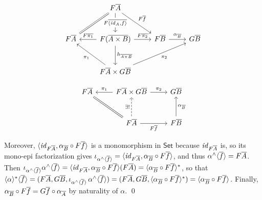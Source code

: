 \documentclass{lmcs}
\theoremstyle{plain}\newtheorem{satz}[thm]{Satz}
\newcommand{\set}{\mathsf{Set}}
\renewcommand{\id}{\mathit{id}}
\begin{document}
\begin{figure*}[ht]
  \vspace*{-0.15in}
  \begin{minipage}[b]{0.45\linewidth}
{\footnotesize
\[\begin{tikzcd}[row sep = large]
        &F\overline{A}
        \ar[d, "{F \overline{\langle \id_A, f \rangle}}" description]
        \ar[dl, equal]
        \ar[dr, "{F\ol{f}}"]\\
        F\overline{A}
        &F(\overline{A \times B})
        \ar[l, "{F\overline{\pi_1}}"']
        \ar[r, "{F\overline{\pi_2}}"]
        \ar[d, "{h_{\overline{A \times B}}}"]
        &F\overline{B}
        \ar[r, "{\alpha_{\ol{B}}}"]
        &G\overline{B}\\
        &F\overline{A} \times G\overline{B}
        \ar[ul, "{\pi_1}"] \ar[urr, "{\pi_2}"']
\end{tikzcd}\]}
\end{minipage}
  \begin{minipage}[b]{0.45\linewidth}
{\footnotesize
\[
      \begin{tikzcd}[row sep = large]
          F\overline{A}
          &F\overline{A} \times G\overline{B}
          \ar[l, "{\pi_1}"'] \ar[r, "{\pi_2}"]
          &G\overline{B}\\
          &F\overline{A}
          \ar[u, dashed, "{\exists !}"]
          \ar[ul, equal]
          \ar[r, "{F\ol{f}}"']
          &F{\ol{B}}
          \ar[u, "{\alpha_{\ol{B}}}"']
      \end{tikzcd}
      \]}
\end{minipage}
\end{figure*}

\vspace*{-0.1in}

\noindent
Moreover, $\langle \id_{F \ol{A}}, \alpha_{\ol{B}} \circ F\ol{f}
\rangle$ is a monomorphism in $\set$ because $\id_{F \ol{A}}$ is, so
its mono-epi factorization gives $\iota_{\alpha^\wedge
  \graph{\overline{f}}} = \langle \id_{F \ol{A}}, \alpha_{\ol{B}}
\circ F\ol{f} \rangle$, and thus $\alpha^\wedge \langle {\overline{f}} \rangle =
F\overline{A}$.  Then $\iota_{\alpha^\wedge \graph{\overline{f}}}
\alpha^\wedge \graph{\overline{f}} = \langle \id_{F \ol{A}},
\alpha_{\ol{B}} \circ F\ol{f} \rangle (F \ol{A}) = \graph{
  \alpha_{\ol{B}} \circ F\ol{f} }^*$, so that $\langle { \alpha } \rangle^*
\langle { \overline{f} } \rangle = (F\overline{A}, G\overline{B},
\iota_{\alpha^\wedge \langle {\overline{f}} \rangle}\, \alpha^\wedge
\langle {\overline{f}} \rangle) = (F\overline{A}, G\overline{B}, \langle {
  \alpha_{\overline{B}} \circ F\overline{f} } \rangle^*) = \langle { \alpha_{\overline{B}} \circ
  F\overline{f} } \rangle$.  Finally, $\alpha_{\overline{B}} \circ F\overline{f} = G\overline{f} \circ
\alpha_{\overline{A}}$ by naturality of $\alpha$.
\qed
\end{document}
